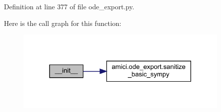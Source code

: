 Definition at line 377 of file ode\+\_\+export.\+py.

Here is the call graph for this function\+:
\nopagebreak
\begin{figure}[H]
\begin{center}
\leavevmode
\includegraphics[width=296pt]{classamici_1_1ode__export_1_1_state_a6d1dffcaf03a86ff057810e5eed3b464_cgraph}
\end{center}
\end{figure}
